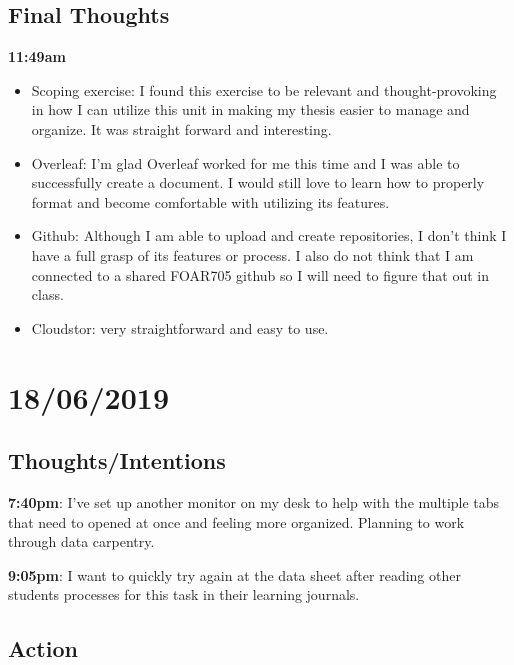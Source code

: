\documentclass{article}
\begin{document}
\subsection{Final Thoughts}

\textbf{11:49am}

\begin{itemize}
\item Scoping exercise: I found this exercise to be relevant and thought-provoking in how I can utilize this unit in making my thesis easier to manage and organize. It was straight forward and interesting. 
\item Overleaf: I’m glad Overleaf worked for me this time and I was able to successfully create a document. I would still love to learn how to properly format and become comfortable with utilizing its features. 
\item Github: Although I am able to upload and create repositories, I don’t think I have a full grasp of its features or process. I also do not think that I am connected to a shared FOAR705 github so I will need to figure that out in class.
\item Cloudstor: very straightforward and easy to use.
\end{itemize}

\section{18/06/2019}
\subsection{Thoughts/Intentions}
\textbf{7:40pm}:  I've set up another monitor on my desk to help with the multiple tabs that need to opened at once and feeling more organized. Planning to work through data carpentry.

\textbf{9:05pm}: I want to quickly try again at the data sheet after reading other students processes for this task in their learning journals. 

\subsection{Action}
\end{document}
